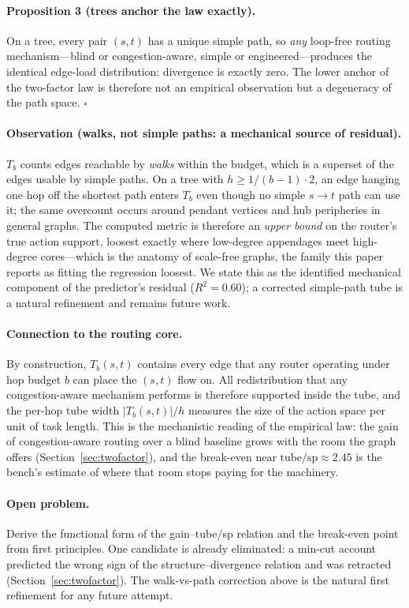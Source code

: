 \paragraph{Proposition 3 (trees anchor the law exactly).}
On a tree, every pair $(s,t)$ has a unique simple path, so \emph{any}
loop-free routing mechanism---blind or congestion-aware, simple or
engineered---produces the identical edge-load distribution: divergence is
exactly zero. The lower anchor of the two-factor law is therefore not an
empirical observation but a degeneracy of the path space.
\hfill$\square$

\paragraph{Observation (walks, not simple paths: a mechanical source of
residual).}
$T_b$ counts edges reachable by \emph{walks} within the budget, which is a
superset of the edges usable by simple paths. On a tree with $h \geq
1/(b-1) \cdot 2$, an edge hanging one hop off the shortest path enters
$T_b$ even though no simple $s\!\to\!t$ path can use it; the same
overcount occurs around pendant vertices and hub peripheries in general
graphs. The computed metric is therefore an \emph{upper bound} on the
router's true action support, loosest exactly where low-degree appendages
meet high-degree cores---which is the anatomy of scale-free graphs, the
family this paper reports as fitting the regression loosest. We state
this as the identified mechanical component of the predictor's residual
($R^2 = 0.60$); a corrected simple-path tube is a natural refinement and
remains future work.

\paragraph{Connection to the routing core.}
By construction, $T_b(s,t)$ contains every edge that any router operating
under hop budget $b$ can place the $(s,t)$ flow on. All redistribution
that any congestion-aware mechanism performs is therefore supported
inside the tube, and the per-hop tube width $|T_b(s,t)|/h$ measures the
size of the action space per unit of task length. This is the
mechanistic reading of the empirical law: the gain of congestion-aware
routing over a blind baseline grows with the room the graph offers
(Section~\ref{sec:twofactor}), and the break-even near
$\mathrm{tube/sp} \approx 2.45$ is the bench's estimate of where that
room stops paying for the machinery.

\paragraph{Open problem.}
Derive the functional form of the gain--tube/sp relation and the
break-even point from first principles. One candidate is already
eliminated: a min-cut account predicted the wrong sign of the
structure--divergence relation and was retracted
(Section~\ref{sec:twofactor}). The walk-vs-path correction above is the
natural first refinement for any future attempt.

